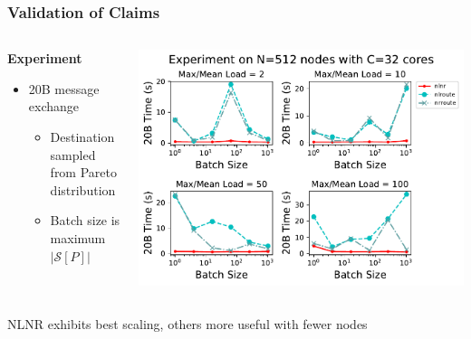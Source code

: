 \documentclass{beamer}
\begin{document}
\begin{frame}
\frametitle{Validation of Claims}


\begin{columns}
\begin{column}{0.3\textwidth}
	\textbf{Experiment}
	\begin{itemize}
		\item 20B message exchange
		\begin{itemize}
			\item Destination sampled from Pareto distribution
			\item Batch size is maximum $|\mathcal{S}[P]|$
		\end{itemize}
	\end{itemize}
\end{column}
\begin{column}{0.7\textwidth}  %
\begin{center}
	\includegraphics[width=1.0\textwidth]{512_32}
\end{center}
\end{column}

\end{columns}

\begin{block}{}
	\begin{center}
		NLNR exhibits best scaling, others more useful with fewer nodes
	\end{center}
\end{block}

\end{frame}

\end{document}
